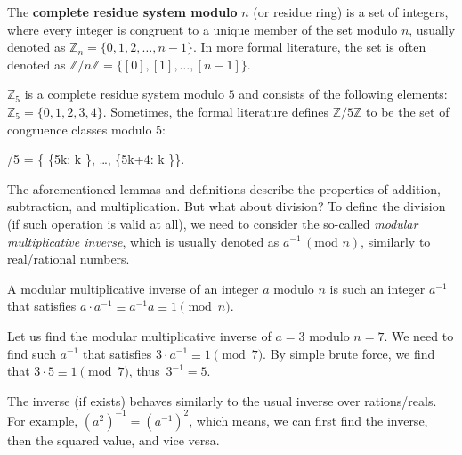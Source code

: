 \documentclass[../lecture-notes-148x210.tex]{subfiles}
\begin{document}
\begin{definition}
    The \textbf{complete residue system modulo} $n$ (or residue ring) is a set of integers, 
    where every integer is congruent to a unique member of the set modulo $n$, usually 
    denoted as $\mathbb{Z}_n = \{0, 1, 2, \dots, n-1\}$. 
    In more formal literature, the set is often denoted as $\mathbb{Z}/n\mathbb{Z} = \{ [0], [1], \ldots, [n-1] \}$.
\end{definition}

\begin{example}
    $\mathbb{Z}_{5}$ is a complete residue system modulo $5$ and consists of the
    following elements: $\mathbb{Z}_5 = \{0, 1, 2, 3, 4\}$. Sometimes, the formal literature 
    defines $\mathbb{Z}/5\mathbb{Z}$ to be the set of congruence classes modulo $5$:
    \begin{xequation}
        /5 = \{ \{5k: k \in {}\}, \dots, \{5k+4: k \in {}\}\}.
    \end{xequation}
\end{example}

The aforementioned lemmas and definitions describe the properties of addition, subtraction, and multiplication. But what about division? To define the division (if such operation is valid at all), we need to consider the so-called \emph{modular multiplicative inverse}, which is usually denoted as $a^{-1} \, (\text{mod } n)$, similarly to real/rational numbers.

\begin{definition}
    A modular multiplicative inverse of an integer $a$ modulo $n$ is such an integer $a^{-1}$ that satisfies $a \cdot a^{-1} \equiv a^{-1}a \equiv 1 \pmod{n}$.
\end{definition}

\begin{example}
    Let us find the modular multiplicative inverse of $a = 3$ modulo $n = 7$.
    We need to find such $a^{-1}$ that satisfies $3 \cdot a^{-1} \equiv 1 \pmod{7}$.
    By simple brute force, we find that $3 \cdot 5 \equiv 1 \pmod{7}$, thus~$3^{-1} = 5$.
\end{example}

\begin{remark}
    The inverse (if exists) behaves similarly to the usual inverse over rations/reals. For example, $(a^{2})^{-1} = (a^{-1})^{2}$, which means, we can first find the inverse, then the squared value, and vice versa.
\end{remark}
\end{document}
